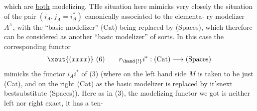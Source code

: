 which are \uline{both} modelizing.  THe situation  here mimicks very closely the
situation of the pair $(i_A, j_A = i_A^* )$ canonically associated to the elementa-%
ry modelizer $A^\wedge$,  with the ``basic modelizer'' (Cat)  being replaced by
(Spaces),  which therefore can be considered  as another ``basic modelizer''
of sorts.  In this case  the corresponding functor
\[ \xout{(xxxx)} \ (6) \qquad r_{\hand{!}} i^* : (\mathrm{Cat}) \longrightarrow (\mathrm{Spaces}) \]
mimicks  the functor  $i_A i^*$ of (3) (where on the left hand side $M$ is
taken to be just (Cat),  and on the right (Cat) as the basic modelizer is
replaced by it'snext bestsubstitute (Spaces)).   Here as in (3),  the
modelizing functor we got is neither left nor right exact,  it has a ten-%

